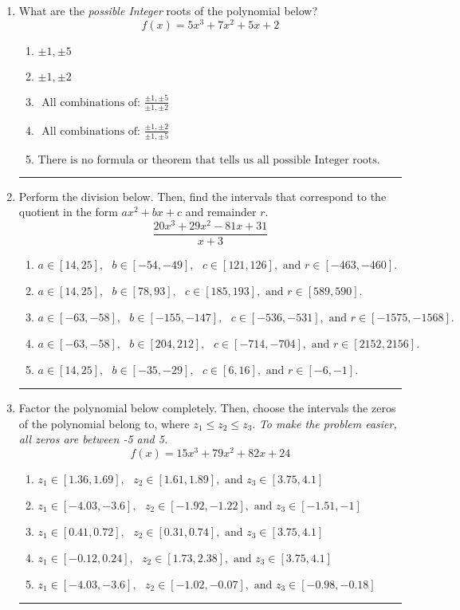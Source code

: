 \documentclass[14pt]{extbook}
\newcommand{\litem}[1]{\item#1\hspace*{-1cm}\rule{\textwidth}{0.4pt}}
\begin{document}
\begin{enumerate}
\litem{
What are the \textit{possible Integer} roots of the polynomial below?\[ f(x) = 5x^{3} +7 x^{2} +5 x + 2 \]\begin{enumerate}[label=\Alph*.]
\item \( \pm 1,\pm 5 \)
\item \( \pm 1,\pm 2 \)
\item \( \text{ All combinations of: }\frac{\pm 1,\pm 5}{\pm 1,\pm 2} \)
\item \( \text{ All combinations of: }\frac{\pm 1,\pm 2}{\pm 1,\pm 5} \)
\item \( \text{There is no formula or theorem that tells us all possible Integer roots.} \)

\end{enumerate} }
\litem{
Perform the division below. Then, find the intervals that correspond to the quotient in the form $ax^2+bx+c$ and remainder $r$.\[ \frac{20x^{3} +29 x^{2} -81 x + 31}{x + 3} \]\begin{enumerate}[label=\Alph*.]
\item \( a \in [14, 25], \text{   } b \in [-54, -49], \text{   } c \in [121, 126], \text{   and   } r \in [-463, -460]. \)
\item \( a \in [14, 25], \text{   } b \in [78, 93], \text{   } c \in [185, 193], \text{   and   } r \in [589, 590]. \)
\item \( a \in [-63, -58], \text{   } b \in [-155, -147], \text{   } c \in [-536, -531], \text{   and   } r \in [-1575, -1568]. \)
\item \( a \in [-63, -58], \text{   } b \in [204, 212], \text{   } c \in [-714, -704], \text{   and   } r \in [2152, 2156]. \)
\item \( a \in [14, 25], \text{   } b \in [-35, -29], \text{   } c \in [6, 16], \text{   and   } r \in [-6, -1]. \)

\end{enumerate} }
\litem{
Factor the polynomial below completely. Then, choose the intervals the zeros of the polynomial belong to, where $z_1 \leq z_2 \leq z_3$. \textit{To make the problem easier, all zeros are between -5 and 5.}\[ f(x) = 15x^{3} +79 x^{2} +82 x + 24 \]\begin{enumerate}[label=\Alph*.]
\item \( z_1 \in [1.36, 1.69], \text{   }  z_2 \in [1.61, 1.89], \text{   and   } z_3 \in [3.75, 4.1] \)
\item \( z_1 \in [-4.03, -3.6], \text{   }  z_2 \in [-1.92, -1.22], \text{   and   } z_3 \in [-1.51, -1] \)
\item \( z_1 \in [0.41, 0.72], \text{   }  z_2 \in [0.31, 0.74], \text{   and   } z_3 \in [3.75, 4.1] \)
\item \( z_1 \in [-0.12, 0.24], \text{   }  z_2 \in [1.73, 2.38], \text{   and   } z_3 \in [3.75, 4.1] \)
\item \( z_1 \in [-4.03, -3.6], \text{   }  z_2 \in [-1.02, -0.07], \text{   and   } z_3 \in [-0.98, -0.18] \)


\end{enumerate}}
\end{enumerate}
\end{document}
